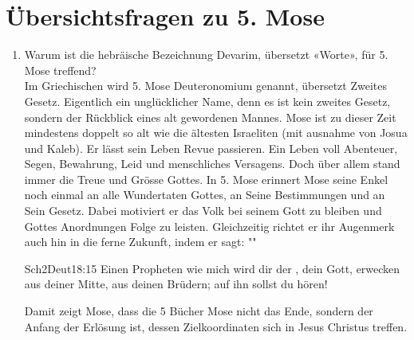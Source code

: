 \section{Übersichtsfragen zu 5. Mose}
\begin{enumerate}
    \item Warum ist die hebräische Bezeichnung Devarim, übersetzt «Worte», für 5. Mose treffend?\\
    Im Griechischen wird 5. Mose \flqq Deuteronomium\frqq{} genannt, übersetzt \flqq Zweites Gesetz\frqq . Eigentlich ein unglücklicher Name, denn es ist kein zweites Gesetz, sondern der Rückblick eines alt gewordenen Mannes. Mose ist zu dieser Zeit mindestens doppelt so alt wie die ältesten Israeliten (mit ausnahme von Josua und Kaleb). Er lässt sein Leben Revue passieren. Ein Leben voll Abenteuer, Segen, Bewahrung, Leid und menschliches Versagens. Doch über allem stand immer die Treue und Grösse Gottes. In 5. Mose erinnert Mose seine Enkel noch einmal an alle Wundertaten Gottes, an Seine Bestimmungen und an Sein Gesetz. Dabei motiviert er das Volk bei seinem Gott zu bleiben und Gottes Anordnungen Folge zu leisten. Gleichzeitig richtet er ihr Augenmerk auch hin in die ferne Zukunft, indem er sagt: ""
    \begin{bibeltext}{Sch2}{Deut}{18:15}
        Einen Propheten wie mich wird dir der \herr, dein Gott, erwecken aus deiner Mitte, aus deinen Brüdern; auf ihn sollst du hören!
    \end{bibeltext}
    Damit zeigt Mose, dass die 5 Bücher Mose nicht das Ende, sondern der Anfang der Erlösung ist, dessen Zielkoordinaten sich in Jesus Christus treffen.
\end{enumerate}